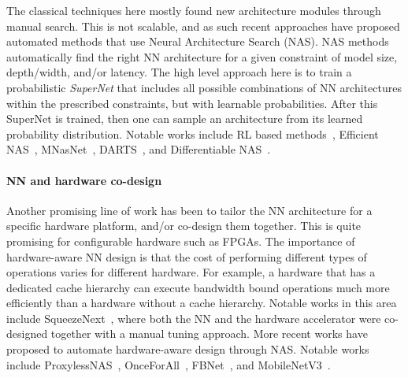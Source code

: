 The classical techniques here mostly found new architecture modules
through manual search. This is not scalable, and as such
recent approaches have proposed automated methods that use
 Neural Architecture Search (NAS). NAS methods
automatically find the right NN architecture for a given constraint
of model size, depth/width, and/or latency.
The high level approach here is to train a probabilistic \emph{SuperNet}
that includes all possible combinations of NN architectures within the prescribed
constraints, but with learnable probabilities. After this SuperNet is trained, then
one can sample an architecture from its learned probability distribution.
Notable works include 
RL based methods~\cite{zoph2016neural},
Efficient NAS~\cite{pham2018efficient},
MNasNet~\cite{tan2019mnasnet},
DARTS~\cite{liu2018darts},
and Differentiable NAS~\cite{wu2019fbnet}.


\paragraph{NN and hardware co-design}
Another promising line of work has been to tailor the NN architecture for a specific hardware
platform, and/or co-design them together. This is quite promising for
configurable hardware such as FPGAs. The importance of hardware-aware NN design is that
the cost of performing different types of operations varies for different hardware.
For example, a hardware that has a dedicated cache hierarchy can execute bandwidth
bound operations much more efficiently than a hardware without a cache hierarchy.
Notable works in this area include SqueezeNext~\cite{gholami2018squeezenext}, where both the NN and the hardware
accelerator were co-designed together with a manual tuning approach.
More recent works have proposed to automate hardware-aware design
through NAS.
Notable works include ProxylessNAS~\cite{cai2018proxylessnas}, OnceForAll~\cite{cai2019once}, FBNet~\cite{wu2019fbnet},
and MobileNetV3~\cite{howard2019searching}.

